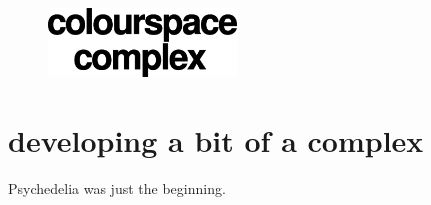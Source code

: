 \clearpage
\vspace*{\fill}
\begin{figure}[H]
    \centering
      \includegraphics[width=5cm]{src/cover/title_page_colorspace.png}%
\end{figure}
\vspace*{\fill}
\thispagestyle{empty}%
\clearpage

\chapter{developing a bit of a complex}
Psychedelia was just the beginning. 

